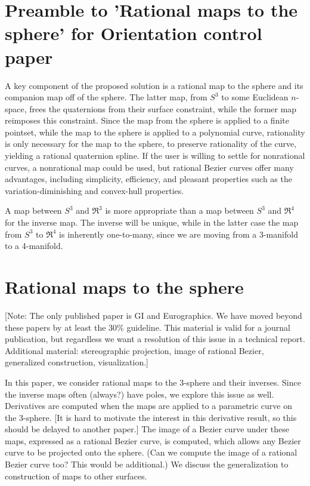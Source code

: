 \documentclass[12pt]{article}
\begin{document}
\clearpage

\section{Preamble to 'Rational maps to the sphere' for Orientation control paper}

A key component of the proposed solution is a rational map to the sphere
and its companion map off of the sphere.
The latter map, from $S^3$ to some Euclidean $n$-space, frees the quaternions from
their surface constraint, while the former map reimposes this constraint.
Since the map from the sphere is applied to a finite pointset, while the map
to the sphere is applied to a polynomial curve, rationality is only necessary for the
map to the sphere, to preserve rationality of the curve, yielding a rational
quaternion spline.
If the user is willing to settle for nonrational curves,
a nonrational map could be used,
but rational Bezier curves offer many advantages, including simplicity,
efficiency, and pleasant properties such as the variation-diminishing and convex-hull
properties.

A map between $S^3$ and $\Re^3$ is more appropriate than a map between $S^3$ and $\Re^4$
for the inverse map.
The inverse will be unique, while in the latter case the map from $S^3$ to $\Re^4$ is
inherently one-to-many, since we are moving from a 3-manifold to a 4-manifold.

\section{Rational maps to the sphere}

[Note: The only published paper is GI and Eurographics.
We have moved beyond these papers by at least the 30\% guideline.
This material is valid for a journal publication, but regardless we want a resolution
of this issue in a technical report.
Additional material: stereographic projection, image of rational Bezier,
generalized construction, visualization.]

In this paper, we consider rational maps to the 3-sphere and their inverses.
Since the inverse maps often (always?) have poles, we explore this issue as well.
Derivatives are computed when the maps are applied to a parametric curve on 
the 3-sphere.
[It is hard to motivate the interest in this derivative result, so this should
be delayed to another paper.]
The image of a Bezier curve under these maps, expressed as a rational Bezier curve,
is computed, which allows any Bezier curve to be projected onto the sphere.
(Can we compute the image of a rational Bezier curve too? This would be additional.)
We discuss the generalization to construction of maps to other surfaces.
\end{document}
